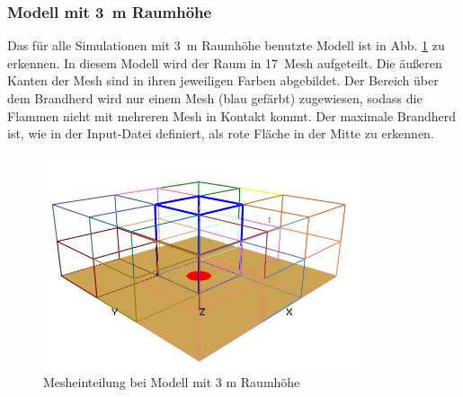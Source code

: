 \subsubsection{Modell mit 3~m Raumhöhe}
\label{sec:modellmit3mraumhöhe}
Das für alle Simulationen mit 3~m Raumhöhe benutzte Modell ist in Abb. \ref{fig:3mRaumMesh} zu erkennen. In diesem Modell wird der Raum in 17~Mesh aufgeteilt. Die äußeren Kanten der Mesh sind in ihren jeweiligen Farben abgebildet. Der Bereich über dem Brandherd wird nur einem Mesh (blau gefärbt) zugewiesen, sodass die Flammen nicht mit mehreren Mesh in Kontakt kommt. Der maximale Brandherd ist, wie in der Input-Datei definiert, als rote Fläche in der Mitte zu erkennen. 
\begin{figure}
    \centering
    \includegraphics[width=0.83\textwidth]{images/3mRaumMesh.png}
    \caption{Mesheinteilung bei Modell mit 3 m Raumhöhe}
    \label{fig:3mRaumMesh}
\end{figure}

